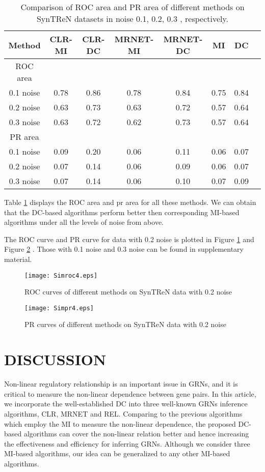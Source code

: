 \documentclass{bioinfo}
\begin{document}
\begin{table}[0.5\textwidth] \tiny
\centering \caption{Comparison of ROC area and PR area of different
methods on SynTReN datasets in noise 0.1, 0.2, 0.3 ,
respectively.}\label{noisy-roc-pr}
\begin{tabular}{cccccccc}
 \hline
 Method & CLR-MI & CLR-DC & MRNET-MI & MRNET-DC & MI & DC \\
 \hline
  ROC area\\
 0.1 noise & 0.78 & 0.86 & 0.78 & 0.84 & 0.75 & 0.84  \\
 0.2 noise & 0.63 & 0.73 & 0.63 & 0.72 & 0.57 & 0.64 \\
 0.3 noise & 0.63 & 0.72 & 0.62 & 0.73 & 0.57 & 0.64 \\
 PR area\\
 0.1 noise & 0.09 & 0.20 & 0.06 & 0.11 & 0.06 & 0.07  \\
 0.2 noise & 0.07 & 0.14 & 0.06 & 0.09 & 0.06 & 0.07  \\
 0.3 noise & 0.07 & 0.14 & 0.06 & 0.10 & 0.07 & 0.09 \\
  \hline
\end{tabular}
\end{table}

 Table \ref{noisy-roc-pr} displays the ROC area and pr area for all
 these methods. We can obtain that the DC-based algorithms perform
 better then corresponding MI-based algorithms under all the levels
 of noise from above.

   The ROC curve and PR curve for data with 0.2 noise is plotted in
   Figure \ref{noisy-roc} and Figure \ref{noisy-pr}
 . Those with 0.1 noise and 0.3 noise can be found in
 supplementary material.
 \begin{figure}[!h]
  \texttt{[image: Simroc4.eps]}
  \caption{ROC curves of different methods on SynTReN data with 0.2 noise}\label{noisy-roc}
\end{figure}

\begin{figure}[!h]
  \texttt{[image: Simpr4.eps]}
  \caption{PR curves of different methods on SynTReN data with 0.2 noise}\label{noisy-pr}
\end{figure}



\section{DISCUSSION}

Non-linear regulatory relationship is an important issue in GRNs, and it is critical to measure the non-linear dependence between gene pairs. In this article,
we incorporate the well-established DC into three well-known GRNs inference algorithms, CLR, MRNET and REL. Comparing to the previous algorithms which employ the MI to measure the non-linear dependence, the proposed DC-based algorithms can cover the non-linear relation better and hence increasing the effectiveness and efficiency for inferring GRNs. Although we consider three MI-based algorithms, our idea can be generalized to any other MI-based algorithms.
\end{document}
